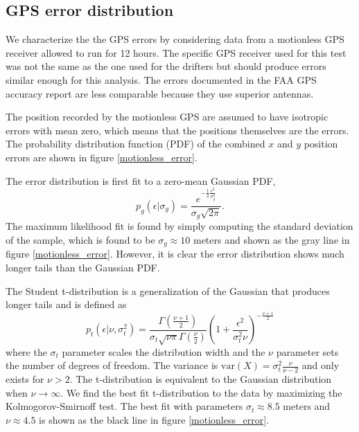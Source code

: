 \documentclass[10pt,journal]{IEEEtran}
\begin{document}
%
\subsection{GPS error distribution}
%

We characterize the the GPS errors by considering data from a motionless GPS receiver allowed to run for 12 hours. The specific GPS receiver used for this test was not the same as the one used for the drifters but should produce errors similar enough for this analysis. The errors documented in the FAA GPS accuracy report \cite{faa2016-report} are less comparable because they use superior antennas.

The position recorded by the motionless GPS are assumed to have isotropic errors with mean zero, which means that the positions themselves are the errors. The probability distribution function (PDF) of the combined $x$ and $y$ position errors are shown in figure \ref{motionless_error}.

The error distribution is first fit to a zero-mean Gaussian PDF,
\begin{equation}
p_g(\epsilon|\sigma_g) = \frac{e^{-\frac{1}{2}\frac{\epsilon^2}{\sigma_g^2}} }{\sigma_g \sqrt{ 2 \pi}}.
\end{equation}
The maximum likelihood fit is found by simply computing the standard deviation of the sample, which is found to be $\sigma_g \approx 10$ meters and shown as the gray line in figure \ref{motionless_error}. However, it is clear the error distribution shows much longer tails than the Gaussian PDF.

The Student t-distribution is a generalization of the Gaussian that produces longer tails and is defined as 
\begin{equation}
\label{student_pdf}
p_t\left(\epsilon |\nu,\sigma_t^2\right) = \frac{\Gamma\left( \frac{\nu + 1}{2} \right)}{\sigma_t \sqrt{\nu \pi} \Gamma\left(\frac{\nu}{2}\right)} \left( 1 + \frac{\epsilon^2}{\sigma_t^2 \nu} \right)^{-\frac{\nu+1}{2}}
\end{equation}
where the $\sigma_t$ parameter scales the distribution width and the $\nu$ parameter sets the number of degrees of freedom. The variance is $\textrm{var}(X)=\sigma_t^2 \frac{\nu}{\nu-2}$ and only exists for $\nu > 2$. The t-distribution is equivalent to the Gaussian distribution when $\nu \rightarrow \infty$. We find the best fit t-distribution to the data by maximizing the Kolmogorov-Smirnoff test. The best fit with parameters $\sigma_t \approx 8.5$ meters and $\nu \approx 4.5$ is shown as the black line in figure \ref{motionless_error}.
\end{document}
